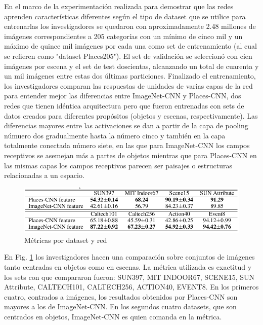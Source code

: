 En el marco de la experimentación realizada para demostrar que las redes aprenden características diferentes según el tipo de dataset que se utilice para entrenarlas los investigadores se quedaron con aproximadamente 2.48 millones de imágenes correspondientes a 205 categorías con un mínimo de cinco mil y un máximo de quince mil imágenes por cada una como set de entrenamiento (al cual se refieren como "dataset Places205"). El set de validación se seleccionó con cien imágenes por escena y el set de test doscientas, alcanzando un total de cuarenta y un mil imágenes entre estas dos últimas particiones. 
Finalizado el entrenamiento, los investigadores comparan las respuestas de unidades de varias capas de la red para entender mejor las diferencias entre ImageNet-CNN y Places-CNN, dos redes que tienen idéntica arquitectura pero que fueron entrenadas con sets de datos creados para diferentes propósitos (objetos y escenas, respectivamente). Las diferencias mayores entre las activaciones se dan a partir de la capa de pooling númuero dos gradualmente hasta la número cinco y también en la capa totalmente conectada número siete, en las que para ImageNet-CNN los campos receptivos se asemejan más a partes de objetos mientras que para Places-CNN en las mismas capas los campos receptivos parecen ser paisajes o estructuras relacionadas a un espacio. 
\begin{figure}[h!]
	\centering
	\includegraphics[width=1\linewidth]{images/places_metrics}
	\caption[Métricas por dataset y red]{Métricas por dataset y red}
	\label{fig:placesmetrics}
\end{figure}
En Fig. \ref{fig:placesmetrics} los investigadores hacen una comparación sobre conjuntos de imágenes tanto centradas en objetos como en escenas. La métrica utilizada es exactitud y los sets con que compararon fueron: SUN397, MIT INDOOR67, SCENE15, SUN Attribute, CALTECH101, CALTECH256, ACTION40, EVENT8. En los primeros cuatro, contrados a imágenes, los resultados obtenidos por Places-CNN son mayores a los de ImageNet-CNN. En los segundos cuatro datasets, que son centrados en objetos, ImageNet-CNN es quien comanda en la métrica. 


